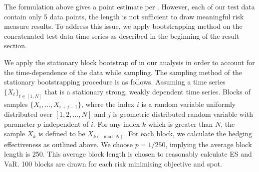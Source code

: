The formulation above gives a point estimate per .
However, each of our test data contain only 5 data points, the length
is not sufficient to draw meaningful risk measure results. 
To address this issue, we apply bootstrapping method on the
concatenated test data time series as described in the beginning of
the result section. 


We apply the stationary block bootstrap of \cite{Politis1994} in our
analysis in order to account for the time-dependence of the data while 
sampling.
The sampling method of the stationary bootstrapping procedure is as
follows. 
Assuming a time series $\{X_t\}_{t \in [1,N]}$ that is
a stationary strong, weakly dependent time series. 
Blocks of samples $\{X_i, ..., X_{i+j-1}\}$, where the index $i$ is a
random variable uniformly distributed over 
$[1,2,...,N]$ and $j$ is geometric distributed random variable with
parameter $p$ independent of $i$. 
For any index $k$ which is greater than $N$, the sample $X_k$ is
defined to be $X_{k(\mod N)}$.  
For each block, we calculate the hedging effectiveness as outlined above.
We choose $p=1/250$, implying the average block length is
250. 
This average block length is chosen to reasonably calculate ES and VaR.
100 blocks are drawn for each risk minimising objective and
spot. 


